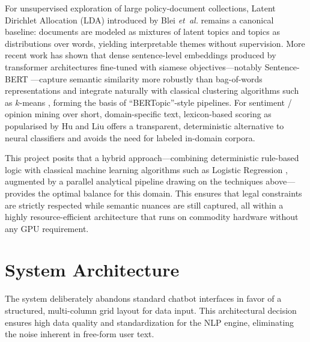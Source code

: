\documentclass[10pt, journal, twocolumn]{IEEEtran}
\begin{document}
For unsupervised exploration of large policy-document collections, Latent Dirichlet Allocation (LDA) introduced by Blei \emph{et~al.} \cite{blei2003lda} remains a canonical baseline: documents are modeled as mixtures of latent topics and topics as distributions over words, yielding interpretable themes without supervision. More recent work has shown that dense sentence-level embeddings produced by transformer architectures fine-tuned with siamese objectives---notably Sentence-BERT \cite{reimers2019sbert}---capture semantic similarity more robustly than bag-of-words representations and integrate naturally with classical clustering algorithms such as $k$-means \cite{macqueen1967kmeans}, forming the basis of ``BERTopic''-style pipelines. For sentiment / opinion mining over short, domain-specific text, lexicon-based scoring as popularised by Hu and Liu \cite{huliu2004opinion} offers a transparent, deterministic alternative to neural classifiers and avoids the need for labeled in-domain corpora.

This project posits that a hybrid approach---combining deterministic rule-based logic with classical machine learning algorithms such as Logistic Regression \cite{cox1958}, augmented by a parallel analytical pipeline drawing on the techniques above---provides the optimal balance for this domain. This ensures that legal constraints are strictly respected while semantic nuances are still captured, all within a highly resource-efficient architecture that runs on commodity hardware without any GPU requirement.

\section{System Architecture}
The system deliberately abandons standard chatbot interfaces in favor of a structured, multi-column grid layout for data input. This architectural decision ensures high data quality and standardization for the NLP engine, eliminating the noise inherent in free-form user text.
\end{document}
